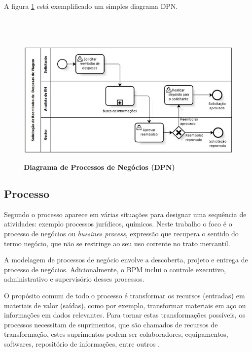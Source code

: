 \documentclass[
	12pt,				%
	openright,			%
	oneside,			%
	a4paper,			%
	chapter=TITLE,		%
	section=TITLE,		%
	english,			%
	french,				%
	spanish,			%
	brazil				%
	]{abntex2}
\begin{document}
A figura \ref{fig-bpmn-exemplo} está exemplificado um simples diagrama DPN.
\\ \\ \\ \\ 

\begin{figure}[htb]
	\begin{center}
		\caption{
			\textbf{Diagrama de Processos de Negócios (DPN)}
		}\label{fig-bpmn-exemplo}
		\includegraphics [scale=0.8]{imagens/bpmn_exemplo.jpg}
		\label{fig-bpmn-exemplo}
	\end{center}
\end{figure}
 

\subsection{Processo}
Segundo  o processo aparece em várias situações para designar uma sequência de atividades: exemplo processos jurídicos, químicos. Neste trabalho o foco é o processo de negócios ou \textit{bussines process}, expressão que recupera o sentido do termo negócio, que não se restringe ao seu uso corrente no trato mercantil. 

A modelagem de processos de negócio envolve a descoberta, projeto e entrega de processo de negócios. Adicionalmente, o BPM inclui o controle executivo, administrativo e supervisório desses processos.

O propósito comum de todo o processo é transformar os recursos (entradas) em materiais de valor (saídas), como por exemplo, transformar materiais em aço ou informações em dados relevantes. Para tornar estas transformações possíveis, os processos necessitam de suprimentos, que são chamados de recursos de transformação, estes suprimentos podem ser colaboradores, equipamentos, softwares, repositório de informações, entre outros \cite{baldamBPM}.
\end{document}
